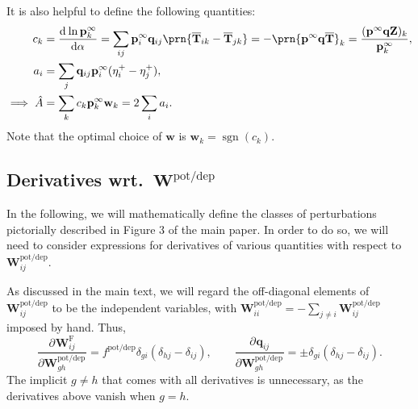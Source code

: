 \documentclass[9pt,twocolumn,twoside,lineno]{pnas-new}
\newcommand{\wrt}{wrt.\ }
\newcommand{\diff}[3][]{\frac{\mathrm{d}^{#1} #2}{\mathrm{d}{#3}^{#1}}}
\newcommand{\pdiff}[3][]{\frac{\partial^{#1} #2}{\partial {#3}^{#1}}}
\DeclareMathOperator{\sgn}{sgn}
\newcommand{\prob}{\mathbf{p}}
\newcommand{\eq}{\prob^\infty}
\newcommand{\fpt}{\mathbf{T}}
\newcommand{\fptb}{\overline{\fpt}}
\newcommand{\fund}{\mathbf{Z}}
\newcommand{\w}{\mathbf{w}}
\newcommand{\W}{\mathbf{W}}
\newcommand{\enc}{\mathbf{q}}
\newcommand{\frg}{\W^{\mathrm{F}}}
\newcommand{\potdep}{^{\text{pot/dep}}}
\providecommand\texorpdfstring[2]{#1}
\begin{document}
\begin{strip}
It is also helpful to define the following quantities:
%
\begin{equation}\label{eq:areacoeffs}
  \begin{aligned}
    c_k &= \diff{\ln\eq_k}{\alpha}
      = \sum_{ij} \eq_i \enc_{ij} \prn{\fptb_{ik}-\fptb_{jk}}
      = - \prn{\eq \enc \fptb}_k
      = \frac{(\eq \enc \fund)_k}{\eq_k}, \\
    a_i &= \sum_j \enc_{ij} \eq_i (\eta^+_{i} - \eta^+_{j}),\\
    \implies
    \hat{A} &= \sum_k c_k \eq_k \w_k
      = 2\sum_i a_i.
  \end{aligned}
\end{equation}
%
Note that the optimal choice of $\w$ is $\w_k = \sgn(c_k)$.

\subsection{Derivatives \wrt \texorpdfstring{$\W\potdep $}{W(pot/dep)}}\label{sec:deriv}

In the following, we will mathematically define the classes of perturbations pictorially described in Figure 3 of the main paper.
In order to do so, we will need to consider expressions for derivatives of various quantities with respect to $\W\potdep_{ij}$.

As discussed in the main text,
we will regard the off-diagonal elements of $\W\potdep _{ij}$ to be the independent variables,
with $\W\potdep _{ii}=-\sum_{j \neq i} \W\potdep _{ij}$ imposed by hand.
Thus,
%
\begin{equation}\label{eq:basicderivs}
  \pdiff{\frg_{ij}}{\W\potdep _{gh}} = f\potdep  \delta_{gi}(\delta_{hj}-\delta_{ij}),
  \qquad
  \pdiff{\enc_{ij}}{\W\potdep _{gh}} = \pm\delta_{gi}(\delta_{hj}-\delta_{ij}).
\end{equation}
%
The implicit $g \neq h$ that comes with all derivatives is unnecessary, as the derivatives above vanish when $g=h$.


\end{strip}
\end{document}
